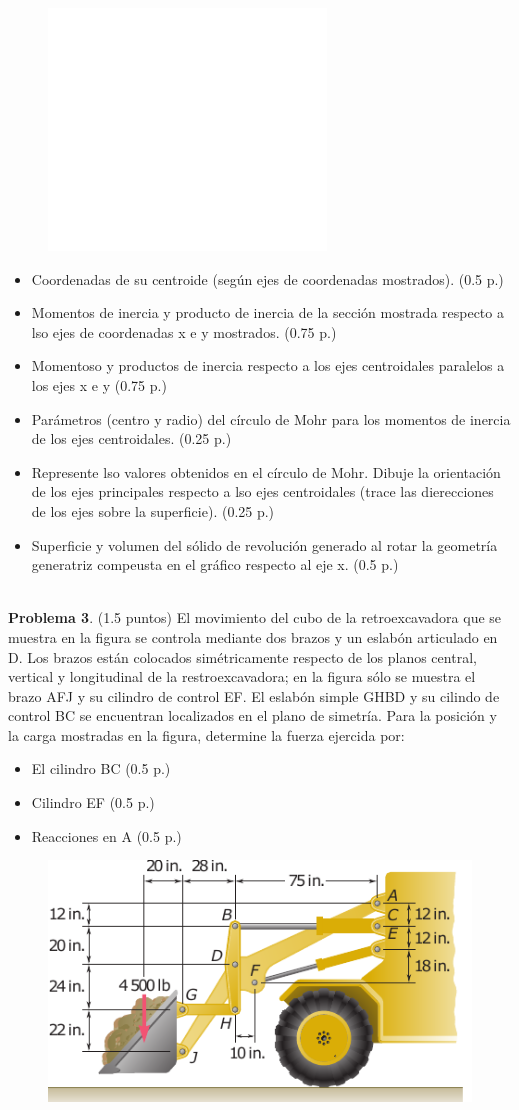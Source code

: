\documentclass[10pt]{article}
\begin{document}
\begin{figure}[h!]
    \centering
    \includegraphics[width=0.35\linewidth]{problema_2.pdf}
  \label{fig:}
\end{figure}
\begin{itemize}
    \item Coordenadas de su centroide (según ejes de coordenadas mostrados). (0.5 p.)
    \item Momentos de inercia y producto de inercia de la sección mostrada respecto a lso ejes de coordenadas x e y mostrados. (0.75 p.)
    \item Momentoso y productos de inercia respecto a los ejes centroidales paralelos a los ejes x e y (0.75 p.)
    \item Parámetros (centro y radio) del círculo de Mohr para los momentos de inercia de los ejes centroidales. (0.25 p.)
    \item Represente lso valores obtenidos en el círculo de Mohr. Dibuje la orientación de los ejes principales respecto a lso ejes centroidales (trace las dierecciones de los ejes sobre la superficie). (0.25 p.)
    \item Superficie y volumen del sólido de revolución generado al rotar la geometría generatriz compeusta en el gráfico respecto al eje x. (0.5 p.)
\end{itemize}
\\
\textbf{Problema 3}. (1.5 puntos) El movimiento del cubo de la retroexcavadora que se muestra en la figura se controla mediante dos brazos y un eslabón articulado en D. Los brazos están colocados simétricamente respecto de los planos central, vertical y longitudinal de la restroexcavadora; en la figura sólo se muestra el brazo AFJ y su cilindro de control EF. El eslabón simple GHBD y su cilindo de control BC se encuentran localizados en el plano de simetría. Para la posición y la carga mostradas en la figura, determine la fuerza ejercida por:
\begin{itemize}
    \item El cilindro BC (0.5 p.)
    \item Cilindro EF (0.5 p.)
    \item Reacciones en A (0.5 p.)
\end{itemize}
\begin{figure}[h!]
    \centering
  \includegraphics[width=0.45\linewidth]{problema_3.pdf}
  \label{fig:}
\end{figure}
\end{document}
